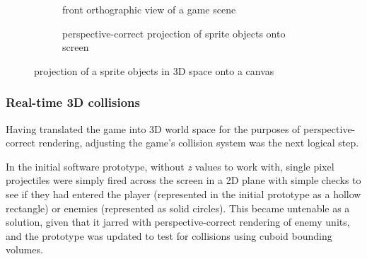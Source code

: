 \documentclass[11pt]{article}
\begin{document}
\begin{figure}[h]
\begin{subfigure}{.3\textwidth}
\begin{tikzpicture}
   \end{tikzpicture}
   \caption{front orthographic view of a game scene}
   \label{fig:rotfig1}
\end{subfigure}\hfill
\begin{subfigure}{.3\textwidth}
   \centering
   \caption{perspective-correct projection of sprite objects onto screen}
   \label{fig:rotfig2}
\end{subfigure}\hfill
\caption{projection of a sprite objects in 3D space onto a canvas}
\label{fig:projection}
\end{figure}

\subsubsection*{Real-time 3D collisions}


Having translated the game into 3D world space for the purposes of perspective-correct rendering, adjusting
the game's collision system was the next logical step.

In the initial software prototype, without \textit{z} values to work with, single pixel projectiles were simply
fired across the screen in a 2D plane with simple checks to see if they had entered the player (represented in
the initial prototype as a hollow rectangle) or enemies (represented as solid circles). This became untenable
as a solution, given that it jarred with perspective-correct rendering of enemy units, and the prototype was
updated to test for collisions using cuboid bounding volumes.
\end{document}
